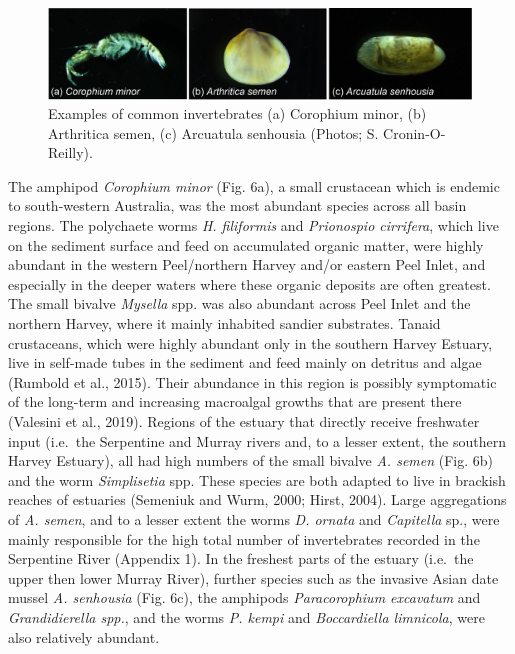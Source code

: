 \documentclass[
]{book}
\begin{document}
\begin{figure}
\includegraphics[width=1\linewidth]{images/BMI/picture8} \caption{Examples of common invertebrates (a) Corophium minor, (b) Arthritica semen, (c) Arcuatula senhousia (Photos; S. Cronin-O-Reilly).}\label{fig:BMI-pic8}
\end{figure}

The amphipod \emph{Corophium minor} (Fig. 6a), a small crustacean which is endemic to south-western Australia, was the most abundant species across all basin regions. The polychaete worms \emph{H. filiformis} and \emph{Prionospio cirrifera}, which live on the sediment surface and feed on accumulated organic matter, were highly abundant in the western Peel/northern Harvey and/or eastern Peel Inlet, and especially in the deeper waters where these organic deposits are often greatest. The small bivalve \emph{Mysella} spp. was also abundant across Peel Inlet and the northern Harvey, where it mainly inhabited sandier substrates. Tanaid crustaceans, which were highly abundant only in the southern Harvey Estuary, live in self-made tubes in the sediment and feed mainly on detritus and algae (Rumbold et al., 2015). Their abundance in this region is possibly symptomatic of the long-term and increasing macroalgal growths that are present there (Valesini et al., 2019). Regions of the estuary that directly receive freshwater input (i.e.~the Serpentine and Murray rivers and, to a lesser extent, the southern Harvey Estuary), all had high numbers of the small bivalve \emph{A. semen} (Fig. 6b) and the worm \emph{Simplisetia} spp. These species are both adapted to live in brackish reaches of estuaries (Semeniuk and Wurm, 2000; Hirst, 2004). Large aggregations of \emph{A. semen}, and to a lesser extent the worms \emph{D. ornata} and \emph{Capitella} sp., were mainly responsible for the high total number of invertebrates recorded in the Serpentine River (Appendix 1). In the freshest parts of the estuary (i.e.~the upper then lower Murray River), further species such as the invasive Asian date mussel \emph{A. senhousia} (Fig. 6c), the amphipods \emph{Paracorophium excavatum} and \emph{Grandidierella spp.}, and the worms \emph{P. kempi} and \emph{Boccardiella limnicola}, were also relatively abundant.~
\end{document}
